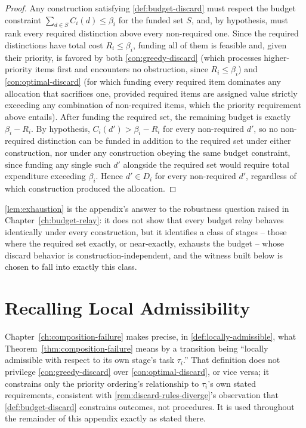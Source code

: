 \begin{proof}
Any construction satisfying \cref{def:budget-discard} must respect the
budget constraint $\sum_{d \in S} C_i(d) \le \beta_i$ for the funded set
$S$, and, by hypothesis, must rank every required distinction above every
non-required one. Since the required distinctions have total cost
$R_i \le \beta_i$, funding all of them is feasible and, given their
priority, is favored by both \cref{con:greedy-discard} (which processes
higher-priority items first and encounters no obstruction, since $R_i \le
\beta_i$) and \cref{con:optimal-discard} (for which funding every required
item dominates any allocation that sacrifices one, provided required
items are assigned value strictly exceeding any combination of
non-required items, which the priority requirement above entails). After
funding the required set, the remaining budget is exactly $\beta_i - R_i$.
By hypothesis, $C_i(d') > \beta_i - R_i$ for every non-required $d'$, so
no non-required distinction can be funded in addition to the required set
under either construction, nor under any construction obeying the same
budget constraint, since funding any single such $d'$ alongside the
required set would require total expenditure exceeding $\beta_i$. Hence
$d' \in D_i$ for every non-required $d'$, regardless of which construction
produced the allocation.
\end{proof}

\cref{lem:exhaustion} is the appendix's answer to the robustness question
raised in Chapter~\ref{ch:budget-relay}: it does not show that every
budget relay behaves identically under every construction, but it
identifies a class of stages -- those where the required set exactly, or
near-exactly, exhausts the budget -- whose discard behavior is
construction-independent, and the witness built below is chosen to fall
into exactly this class.

\section{Recalling Local Admissibility}

Chapter~\ref{ch:composition-failure} makes precise, in
\cref{def:locally-admissible}, what Theorem~\ref{thm:composition-failure}
means by a transition being ``locally admissible with respect to its own
stage's task $\tau_i$.'' That definition does not privilege
\cref{con:greedy-discard} over \cref{con:optimal-discard}, or vice versa;
it constrains only the priority ordering's relationship to $\tau_i$'s own
stated requirements, consistent with \cref{rem:discard-rules-diverge}'s
observation that \cref{def:budget-discard} constrains outcomes, not
procedures. It is used throughout the remainder of this appendix exactly
as stated there.

